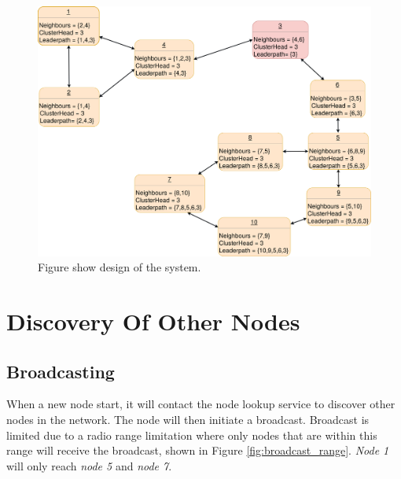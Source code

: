 \documentclass[USenglish]{uit-thesis}
\begin{document}
\begin{figure}
\centering
\includegraphics[width=\textwidth]{design.png}
\caption{Figure show design of the system.}
\label{fig:design}
\end{figure}


\section{Discovery Of Other Nodes}
\subsection{Broadcasting}
When a new node start, it will contact the node lookup service to discover other nodes in the network. The node will then initiate a broadcast.
Broadcast is limited due to a radio range limitation where only nodes that are within this range will receive the broadcast, shown in Figure \ref{fig:broadcast_range}. \textit{Node 1} will only reach \textit{node 5} and \textit{node 7}.
\end{document}
